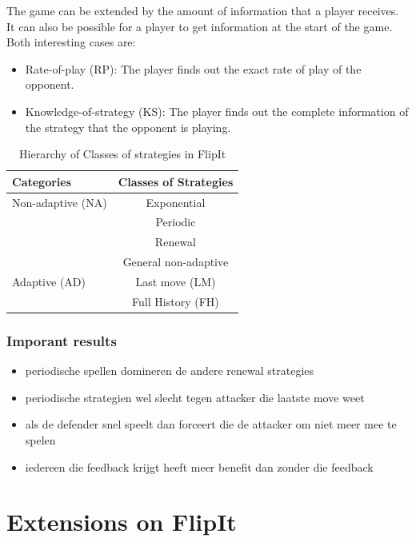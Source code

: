 
The game can be extended by the amount of information that a player receives. It can also be possible for a player to get information at the start of the game. Both interesting cases are:
\begin{itemize}
\item Rate-of-play (RP): The player finds out the exact rate of play of the opponent.
\item Knowledge-of-strategy (KS): The player finds out the complete information of the strategy that the opponent is playing.
\end{itemize}




 

 \begin{table}
 \centering
 \begin{tabular}{ l | c  }
  \textbf{Categories} & \textbf{Classes of Strategies} \\
  \hline Non-adaptive (NA) & Exponential \\
  & Periodic \\
  & Renewal \\
  & General non-adaptive \\
  \hline Adaptive (AD) & Last move (LM) \\
  & Full History (FH) \\  
\end{tabular}
 \caption{Hierarchy of Classes of strategies in FlipIt}
 \label{table:Strategies}
 \end{table}




\subsubsection{Imporant results}

\begin{itemize}
\item periodische spellen domineren de andere renewal strategies
\item periodische strategien wel slecht tegen attacker die laatste move weet
\item als de defender snel speelt dan forceert die de attacker om niet meer mee te spelen
\item iedereen die feedback krijgt heeft meer benefit dan zonder die feedback
\end{itemize}
 
\section{Extensions on FlipIt}
\label{ch:extendedWork}


